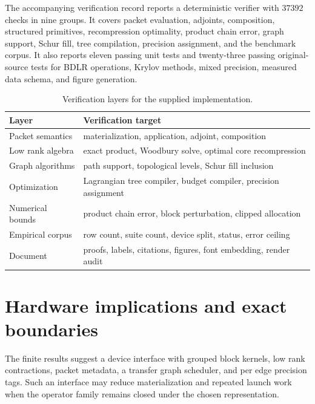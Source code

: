 The accompanying verification record reports a deterministic verifier with $37392$ checks in nine groups. It covers packet evaluation, adjoints, composition, structured primitives, recompression optimality, product chain error, graph support, Schur fill, tree compilation, precision assignment, and the benchmark corpus. It also reports eleven passing unit tests and twenty-three passing original-source tests for BDLR operations, Krylov methods, mixed precision, measured data schema, and figure generation.

\begin{table}[t]
\centering
\small
\begin{tabular}{>{\raggedright\arraybackslash}p{}>{\raggedright\arraybackslash}p{}}
\toprule
Layer & Verification target \\
\midrule
Packet semantics & materialization, application, adjoint, composition \\
Low rank algebra & exact product, Woodbury solve, optimal core recompression \\
Graph algorithms & path support, topological levels, Schur fill inclusion \\
Optimization & Lagrangian tree compiler, budget compiler, precision assignment \\
Numerical bounds & product chain error, block perturbation, clipped allocation \\
Empirical corpus & row count, suite count, device split, status, error ceiling \\
Document & proofs, labels, citations, figures, font embedding, render audit \\
\bottomrule
\end{tabular}
\caption{Verification layers for the supplied implementation.}
\label{tab:verification_layers}
\end{table}

\section{Hardware implications and exact boundaries}\label{main:section:014}\label{sec:boundaries}

The finite results suggest a device interface with grouped block kernels, low rank contractions, packet metadata, a transfer graph scheduler, and per edge precision tags. Such an interface may reduce materialization and repeated launch work when the operator family remains closed under the chosen representation.

